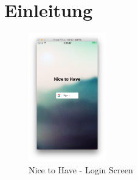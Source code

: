 \section{Einleitung}

\begin{frame}

\begin{figure}
  \centering
    \includegraphics[width=0.3\textwidth]{images/login_screen}
    \caption{Nice to Have - Login Screen}
  \label{fig:login_screen}
\end{figure}

\end{frame}